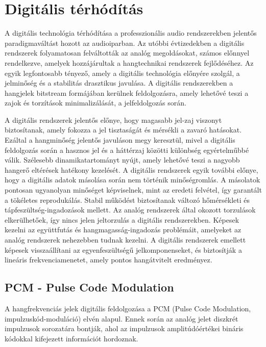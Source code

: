 \section{Digitális térhódítás~\cite{DIGITALSIGNALPROCESSING}} %
A digitális technológia térhódítása a professzionális audio rendszerekben jelentős paradigmaváltást hozott az audioiparban. 
Az utóbbi évtizedekben a digitális rendszerek folyamatosan felváltották az analóg megoldásokat, számos előnnyel rendelkezve, 
amelyek hozzájárultak a hangtechnikai rendszerek fejlődéséhez. 
Az egyik legfontosabb tényező, amely a digitális technológia előnyére szolgál, a jelminőség és a stabilitás drasztikus javulása. 
A digitális rendszerekben a hangjelek bitstream formájában kerülnek feldolgozásra, amely lehetővé teszi a zajok és torzítások minimalizálását,
a jelfeldolgozás során. 

A digitális rendszerek jelentős előnye, hogy magasabb jel-zaj viszonyt biztosítanak, amely fokozza a jel tisztaságát és mérsékli a zavaró hatásokat. 
Ezáltal a hangminőség jelentős javuláson megy keresztül, mivel a digitális feldolgozás során a hasznos jel és a 
háttérzaj közötti különbség egyértelműbbé válik.
Szélesebb dinamikatartományt nyújt, amely lehetővé teszi a nagyobb hangerő eltérések hatékony kezelését. 
A digitális rendszerek egyik további előnye, hogy a digitális adatok másolása során nem történik minőségromlás. 
A másolatok pontosan ugyanolyan minőséget képviselnek, mint az eredeti felvétel, így garantált a tökéletes reprodukálás.
Stabil működést biztosítanak változó hőmérsékleti és tápfeszültség-ingadozások mellett. 
Az analóg rendszerek által okozott torzulások elkerülhetőek, így nincs jelen jeltorzulás a digitális rendszerekben.
Képesek kezelni az együttfutás és hangmagasság-ingadozás problémáit, amelyeket az analóg rendszerek nehezebben tudnak kezelni.
A digitális rendszerek emellett képesek visszaállítani az egyenfeszültségű jelkomponenseket, és biztosítják 
a lineáris frekvenciamenetet, amely pontos hangátvitelt eredményez. 
\subsection{PCM - Pulse Code Modulation}
A hangfrekvenciás jelek digitális feldolgozása a PCM (Pulse Code Modulation, impulzuskód-moduláció) elvén alapul. 
Ennek során az analóg jelet diszkrét impulzusok sorozatára bontják, ahol az impulzusok 
amplitúdóértékei bináris kódokkal kifejezett információt hordoznak.

